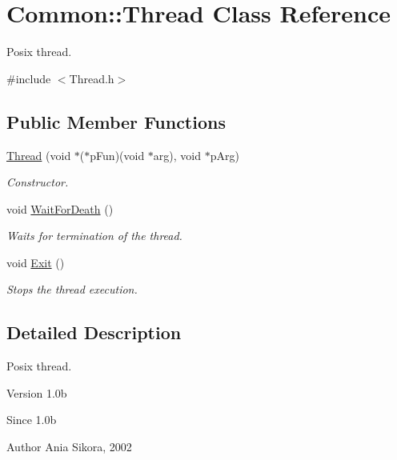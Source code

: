 \hypertarget{class_common_1_1_thread}{\section{Common\-:\-:Thread Class Reference}
\label{class_common_1_1_thread}
}


Posix thread.  




{\ttfamily \#include $<$Thread.\-h$>$}

\subsection*{Public Member Functions}
\begin{DoxyCompactItemize}
\item 
\hyperlink{class_common_1_1_thread_ae672e8e879bc5c048e2f81da2f614186}{Thread} (void $\ast$($\ast$p\-Fun)(void $\ast$arg), void $\ast$p\-Arg)
\begin{DoxyCompactList}\small\item\em Constructor. \end{DoxyCompactList}\item 
void \hyperlink{class_common_1_1_thread_a95ca11575b136f8ec0c6514d9a4bd8ae}{Wait\-For\-Death} ()
\begin{DoxyCompactList}\small\item\em Waits for termination of the thread. \end{DoxyCompactList}\item 
\hypertarget{class_common_1_1_thread_a8c7f228ddb28d902727c412c834dd2b5}{void \hyperlink{class_common_1_1_thread_a8c7f228ddb28d902727c412c834dd2b5}{Exit} ()}\label{class_common_1_1_thread_a8c7f228ddb28d902727c412c834dd2b5}

\begin{DoxyCompactList}\small\item\em Stops the thread execution. \end{DoxyCompactList}\end{DoxyCompactItemize}


\subsection{Detailed Description}
Posix thread. 

\begin{DoxyVersion}{Version}
1.\-0b 
\end{DoxyVersion}
\begin{DoxySince}{Since}
1.\-0b 
\end{DoxySince}
\begin{DoxyAuthor}{Author}
Ania Sikora, 2002 
\end{DoxyAuthor}



